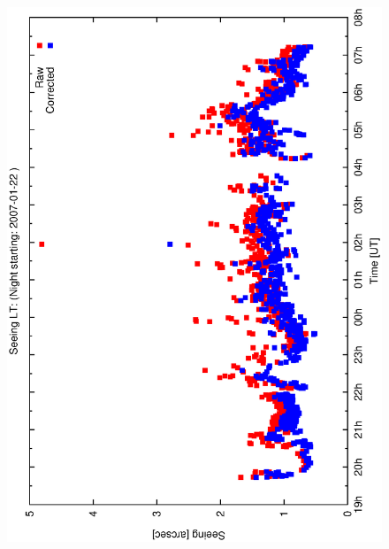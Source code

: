 {{\begin{figure}[htbp]
\begin{center}
{    \includegraphics[scale=0.25, angle=-90]{figures/ecs/see_profile_2007_01_22.eps} 
    \label{fig:see_profile_2007_01_22}
  }
\end{center}
\end{figure}}}
